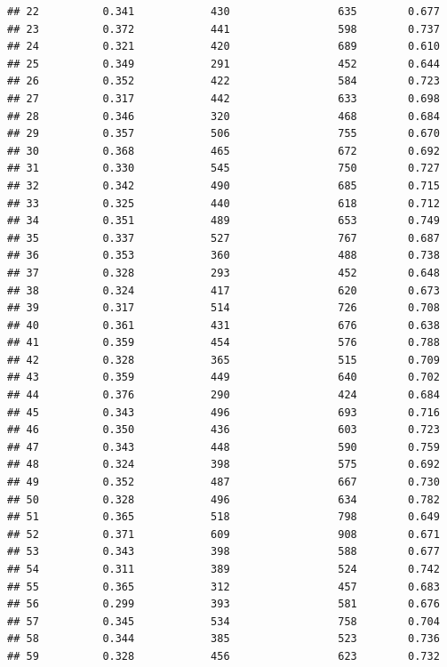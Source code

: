 \documentclass[]{book}
\begin{document}
\begin{verbatim}
## 22          0.341            430                 635        0.677
## 23          0.372            441                 598        0.737
## 24          0.321            420                 689        0.610
## 25          0.349            291                 452        0.644
## 26          0.352            422                 584        0.723
## 27          0.317            442                 633        0.698
## 28          0.346            320                 468        0.684
## 29          0.357            506                 755        0.670
## 30          0.368            465                 672        0.692
## 31          0.330            545                 750        0.727
## 32          0.342            490                 685        0.715
## 33          0.325            440                 618        0.712
## 34          0.351            489                 653        0.749
## 35          0.337            527                 767        0.687
## 36          0.353            360                 488        0.738
## 37          0.328            293                 452        0.648
## 38          0.324            417                 620        0.673
## 39          0.317            514                 726        0.708
## 40          0.361            431                 676        0.638
## 41          0.359            454                 576        0.788
## 42          0.328            365                 515        0.709
## 43          0.359            449                 640        0.702
## 44          0.376            290                 424        0.684
## 45          0.343            496                 693        0.716
## 46          0.350            436                 603        0.723
## 47          0.343            448                 590        0.759
## 48          0.324            398                 575        0.692
## 49          0.352            487                 667        0.730
## 50          0.328            496                 634        0.782
## 51          0.365            518                 798        0.649
## 52          0.371            609                 908        0.671
## 53          0.343            398                 588        0.677
## 54          0.311            389                 524        0.742
## 55          0.365            312                 457        0.683
## 56          0.299            393                 581        0.676
## 57          0.345            534                 758        0.704
## 58          0.344            385                 523        0.736
## 59          0.328            456                 623        0.732

\end{verbatim}
\end{document}
